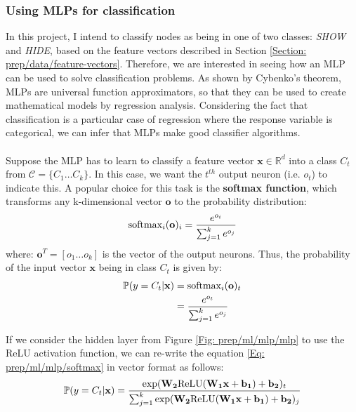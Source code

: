 	\subsubsection*{Using MLPs for classification}
	In this project, I intend to classify nodes as being in one of two classes: \textit{SHOW} and \textit{HIDE}, based on the feature vectors described in Section \ref{Section: prep/data/feature-vectors}. Therefore, we are interested in seeing how an MLP can be used to solve classification problems. As shown by Cybenko's theorem\cite{sigmoidal}, MLPs are universal function approximators, so that they can be used to create mathematical models by regression analysis. Considering the fact that classification is a particular case of regression where the response variable is categorical, we can infer that MLPs make good classifier algorithms. 
	\\ \\
	Suppose the MLP has to learn to classify a feature vector $\mathbf{x} \in \mathbb{R}^d$ into a class $C_t$ from $\mathcal{C} = \{C_1\dots C_k\}$. In this case, we want the $t^{th}$ output neuron (i.e. $o_t$) to indicate this. A popular choice for this task is the \textbf{softmax function}, which transforms any k-dimensional vector $\mathbf{o}$ to the probability distribution:
	\begin{equation}
		\centering
		\text{softmax}_i(\mathbf{o})_i = \frac{e^{o_i}}{\sum_{j=1}^{k}e^{o_j}}
	\end{equation}
	where: $\mathbf{o}^T = [o_1\dots o_k]$ is the vector of the output neurons. Thus, the probability of the input vector $\mathbf{x}$ being in class $C_t$ is given by:
	\begin{equation}
		\centering
		\begin{split}
			\mathbb{P}(y = C_t | \mathbf{x}) & = \text{softmax}_i(\mathbf{o})_t \\
			& = \frac{e^{o_t}}{\sum_{j=1}^{k}e^{o_j}}
		\end{split}
		\label{Eq: prep/ml/mlp/softmax}
	\end{equation} 
	
	If we consider the hidden layer from Figure \ref{Fig: prep/ml/mlp/mlp} to use the ReLU activation function, we can re-write the equation \ref{Eq: prep/ml/mlp/softmax} in vector format as follows: 
	\begin{equation}
		\centering
		\mathbb{P}(y=C_t | \mathbf{x}) = \frac
		{
			\exp (\mathbf{W_2}\text{ReLU}(\mathbf{W_1 x} + \mathbf{b_1}) + \mathbf{b_2})_t
		}
		{
			{\sum_{j=1}^{k}\exp (\mathbf{W_2}\text{ReLU}(\mathbf{W_1 x} + \mathbf{b_1}) + \mathbf{b_2})_j}
		} 
	\end{equation}
	
